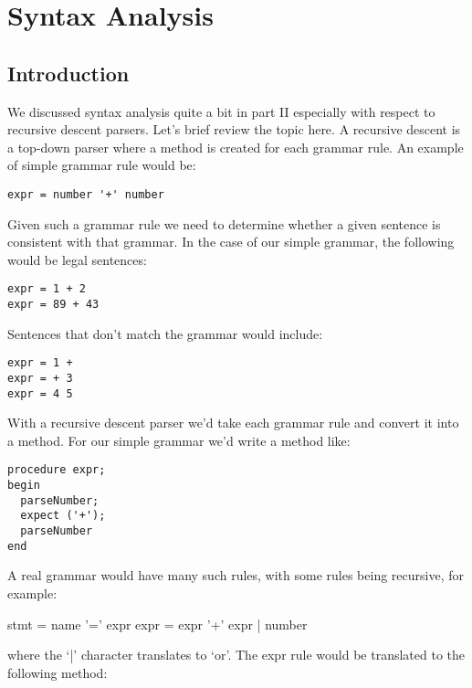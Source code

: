{\bfseries\slshape\sffamily\color{ChapterTitleColor} \chapter{Syntax Analysis}} \label{chap:syntaxanalysis}

\section{Introduction}

We discussed syntax analysis quite a bit in part II especially with respect to recursive descent parsers. Let's brief review the topic here. A recursive descent is a top-down parser where a method is created for each grammar rule. An example of simple grammar rule would be:

\begin{lstlisting}
expr = number '+' number
\end{lstlisting}

Given such a grammar rule we need to determine whether a given sentence is consistent with that grammar. In the case of our simple grammar, the following would be legal sentences:

\begin{lstlisting}
expr = 1 + 2
expr = 89 + 43
\end{lstlisting}

Sentences that don't match the grammar would include:

\begin{lstlisting}
expr = 1 +
expr = + 3
expr = 4 5
\end{lstlisting}

With a recursive descent parser we'd take each grammar rule and convert it into a method. For our simple grammar we'd write a method like:

\begin{lstlisting}
procedure expr;
begin
  parseNumber;
  expect ('+');
  parseNumber
end
\end{lstlisting}

A real grammar would have many such rules, with some rules being recursive, for example:

\begin{small}
\begin{code}
stmt =   name '=' expr
expr =   expr '+' expr
       | number
\end{code}
\end{small}

where the `|' character translates to `or'. The expr rule would be translated to the following method:

